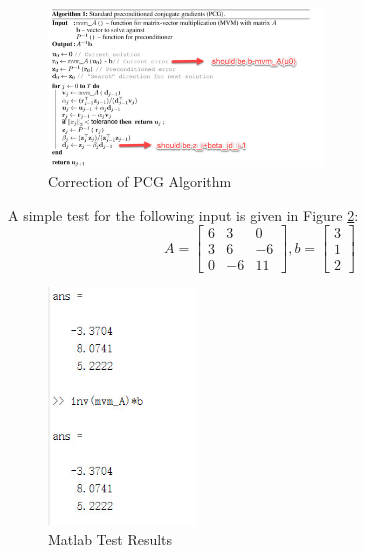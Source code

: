 \documentclass{article} %
\begin{document}
 \begin{figure}[H]
	\begin{center}
		\includegraphics[width=0.65\textwidth]{PCG}
	\end{center}
	\caption{Correction of PCG Algorithm}
	\label{fig3}
\end{figure}
A simple test for the following input is given in Figure \ref{fig4}:
\begin{equation}
A={
	\left[ \begin{array}{ccc}
	6 & 3 & 0\\
	3 & 6 & -6\\
	0 & -6 & 11
	\end{array} 
	\right ]},
b={
	\left[ \begin{array}{ccc}
	3 \\
	1\\
	2 
	\end{array}
	\right ]}
\end{equation}

 \begin{figure}[H]
	\begin{center}
		\includegraphics[width=0.35\textwidth]{test2}
	\end{center}
	\caption{Matlab Test Results}
	\label{fig4}
\end{figure}
\end{document}
